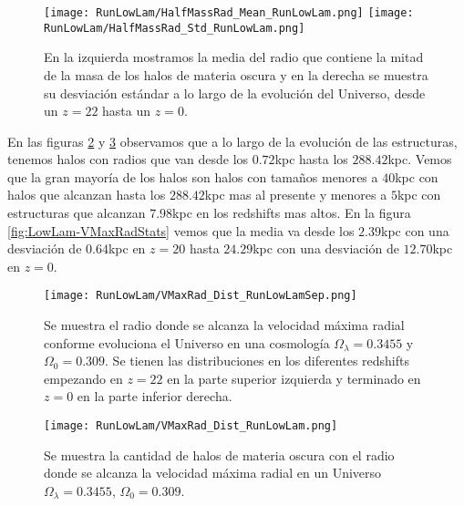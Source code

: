 \begin{figure}[H]
    \centering
    \texttt{[image: RunLowLam/HalfMassRad\_Mean\_RunLowLam.png]}
    \texttt{[image: RunLowLam/HalfMassRad\_Std\_RunLowLam.png]}
    \caption[Media y desviación estándar del radio de la mitad de la masa de un Universo $\Omega_\lambda = 0.3455$, $\Omega_0 = 0.309$]{\footnotesize En la izquierda mostramos la media del radio que contiene la mitad de la masa de los halos de materia oscura y en la derecha se muestra su desviación estándar a lo largo de la evolución del Universo, desde un $z=22$ hasta un $z=0$.}
    \label{fig:LowLam-HalfMassRadStats}
\end{figure}

En las figuras \ref{fig:LowLam-VMaxRadDistSep} y \ref{fig:LowLam-VMaxRadDist} observamos que a lo largo de la evolución de las estructuras, tenemos halos con radios que van desde los $0.72$kpc hasta los $288.42$kpc. Vemos que la gran mayoría de los halos son halos con tamaños menores a $40$kpc con halos que alcanzan hasta los $288.42$kpc mas al presente y menores a $5$kpc con estructuras que alcanzan $7.98$kpc en los redshifts mas altos. En la figura \ref{fig:LowLam-VMaxRadStats} vemos que la media va desde los $2.39$kpc con una desviación de $0.64$kpc en $z=20$ hasta $24.29$kpc con una desviación de $12.70$kpc en $z=0$.

\begin{figure}[H]
    \centering
    \texttt{[image: RunLowLam/VMaxRad\_Dist\_RunLowLamSep.png]}
    \caption[Radio donde se alcanza la velocidad máxima radial en la evolución de un Universo $\Omega_\lambda = 0.3455$, $\Omega_0 = 0.309$]{\footnotesize Se muestra el radio donde se alcanza la velocidad máxima radial conforme evoluciona el Universo en una cosmología $\Omega_\lambda = 0.3455$ y $\Omega_0 = 0.309$. Se tienen las distribuciones en los diferentes redshifts empezando en $z=22$ en la parte superior izquierda y terminado en $z=0$ en la parte inferior derecha.}
    \label{fig:LowLam-VMaxRadDistSep}
\end{figure}

\begin{figure}[H]
    \centering
    \texttt{[image: RunLowLam/VMaxRad\_Dist\_RunLowLam.png]}
    \caption[Distribución del radio donde se alcanza la velocidad máxima radial de un Universo $\Omega_\lambda = 0.3455$, $\Omega_0 = 0.309$]{\footnotesize Se muestra la cantidad de halos de materia oscura con el radio donde se alcanza la velocidad máxima radial en un Universo $\Omega_\lambda = 0.3455$, $\Omega_0 = 0.309$.}
    \label{fig:LowLam-VMaxRadDist}
\end{figure}

